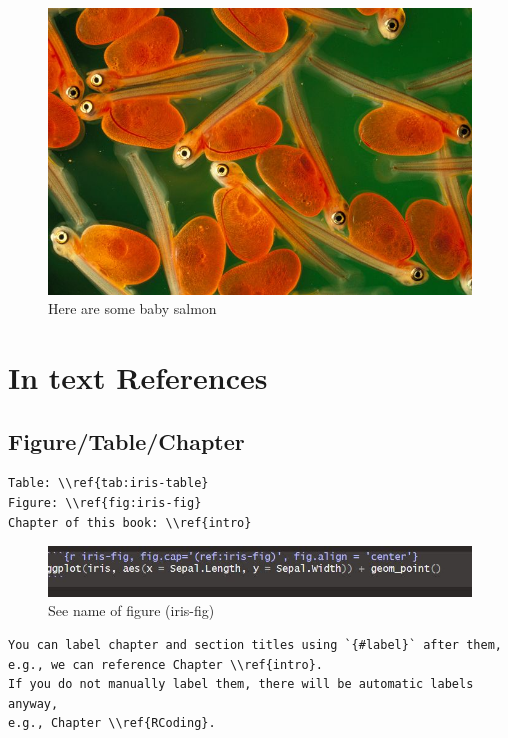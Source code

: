 \documentclass[
]{book}
\begin{document}
\begin{figure}
\centering
\includegraphics{salmon.jpg}
\caption{Here are some baby salmon}
\end{figure}

\hypertarget{in-text-references}{%
\section{In text References}\label{in-text-references}}

\hypertarget{figuretablechapter}{%
\subsection{Figure/Table/Chapter}\label{figuretablechapter}}

\begin{verbatim}
Table: \\ref{tab:iris-table}
Figure: \\ref{fig:iris-fig}
Chapter of this book: \\ref{intro}
\end{verbatim}

\begin{figure}
\centering
\includegraphics{FigureCaption.jpg}
\caption{See name of figure (iris-fig)}
\end{figure}

\begin{verbatim}
You can label chapter and section titles using `{#label}` after them,  
e.g., we can reference Chapter \\ref{intro}.   
If you do not manually label them, there will be automatic labels anyway,  
e.g., Chapter \\ref{RCoding}.
\end{verbatim}
\end{document}
